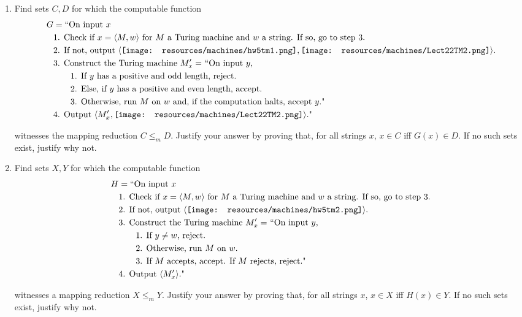 \documentclass[12pt, oneside]{article}
\begin{document}
\begin{enumerate}
\begin{enumerate}
    \vfill
    
    \item Find sets $C, D$ for which  the computable function
    \begin{align*}
    G &= \text{``On input $x$} \\
    &\text{1. Check if $x = \langle M, w \rangle$ for $M$ a Turing machine and $w$ a string. If so, go to  step 3.}\\
    &\text{2. If not, output  $\langle \texttt{[image: resources/machines/hw5tm1.png]},   \texttt{[image: resources/machines/Lect22TM2.png]} \rangle$.}\\
    &\text{3. Construct the Turing machine $M'_x = $ ``On input $y$,} \\
    &\text{\qquad 1. If $y$ has a positive and odd length, reject.}\\
    &\text{\qquad 2. Else, if $y$ has a positive and even length, accept.}\\
    &\text{\qquad 3. Otherwise, run $M$ on $w$ and, if the computation halts, accept $y$."}\\
    &\text{4. Output  $\langle M'_x , \texttt{[image: resources/machines/Lect22TM2.png]}\rangle$."}
    \end{align*}
    
    \vspace{-10pt}
    
    witnesses the mapping reduction $C  \leq_m D$.
    Justify your  answer by  proving that, for all  strings $x$, $x \in C $ iff  $G(x) \in D$.
    If no such sets exist, justify why not.

    
    \vfill
    
    \item Find sets $X, Y$ for which  the computable function
    \begin{align*}
    H &= \text{``On input $x$} \\
    &\text{1. Check if $x = \langle M, w \rangle$ for $M$ a Turing machine and $w$ a string. If so, go to  step 3.}\\
    &\text{2. If not, output  $\langle \texttt{[image: resources/machines/hw5tm2.png]}\rangle$.}\\
    &\text{3. Construct the Turing machine $M'_x = $ ``On input $y$,} \\
    &\text{\qquad 1. If $y \neq w$, reject.}\\
    &\text{\qquad 2. Otherwise, run $M$ on $w$.}\\
    &\text{\qquad 3. If $M$  accepts,  accept.  If  $M$ rejects, reject."} \\
    &\text{4. Output  $\langle M'_x \rangle$."}
    \end{align*}
    
    \vspace{-10pt}
    
    witnesses a mapping reduction $X \leq_m Y$. 
    Justify your  answer by  proving that, for all  strings $x$, $x \in X $ iff  $H(x) \in Y$.
    If no such sets exist, justify why not.
    
    \end{enumerate}
\end{enumerate}
\end{document}
